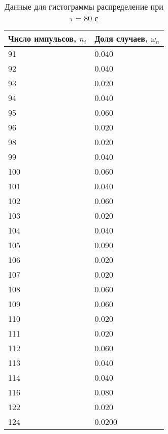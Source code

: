 \documentclass[a4paper]{article}
\begin{document}
\begin{table}[!h]
\begin{center}
\begin{tabular}{|l|l|}
\hline
Число импульсов, $n_{i}$ & Доля случаев, $\omega_{n}$ \\\hline
91                       & 0.040                       \\\hline
92                       & 0.040                       \\\hline
93                       & 0.020                       \\\hline
94                       & 0.040                       \\\hline
95                       & 0.060                       \\\hline
96                       & 0.020                      \\\hline
98                       & 0.020                      \\\hline
99                       & 0.040                      \\\hline
100                       & 0.060                      \\\hline
101                      & 0.040                      \\\hline
102                      & 0.060                      \\\hline
103                      & 0.020                      \\\hline
104                      & 0.040                      \\\hline
105                      & 0.090                      \\\hline
106                      & 0.020                      \\\hline
107                      & 0.020                     \\\hline
108                      & 0.060                      \\\hline
109                      & 0.060                      \\\hline
110                      & 0.020                      \\\hline
111                      & 0.020                      \\\hline
112                      & 0.060                      \\\hline
113                      & 0.040                      \\\hline
114                      & 0.040                      \\\hline
116                      & 0.080                     \\\hline
122                      & 0.020                      \\\hline
124                      & 0.0200                      \\\hline

\end{tabular}
\caption{Данные для гистограммы распределение при $\tau = 80$ с}
\end{center}
\end{table}
\end{document}
